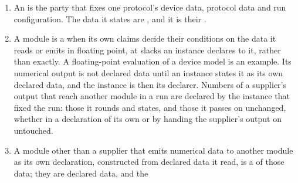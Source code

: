 
\begin{definition}\label{def:declared-data}
\begin{enumerate}[label=(\roman*),leftmargin=2.4em]
\item An  is the party that fixes one protocol's
  device data, protocol data and run configuration. The data it states are
  , and it is their
  .
\item A module is a  when its own claims decide their
  conditions on the data it reads or emits in floating point, at slacks an
  instance declares to it, rather than exactly. A floating-point evaluation of
  a device model is an example. Its numerical output is not
  declared data until an instance states it as its own declared data, and the
  instance is then its declarer. Numbers of a supplier's output that reach
  another module in a run are declared by the instance that fixed the run:
  those it rounds and states, and those it passes on unchanged, whether in a
  declaration of its own or by handing the supplier's output on untouched.
\item A module other than a supplier that emits numerical data to another
  module as its own declaration, constructed from declared data it read, is a
   of those data; they are declared data, and the

\end{enumerate}
\end{definition}
